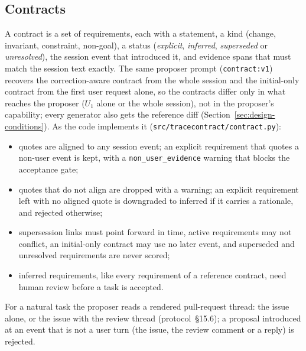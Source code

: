 \subsection{Contracts}
\label{sec:contracts}
A contract is a set of requirements, each with a statement, a kind (change, invariant, constraint, non-goal), a status
(\emph{explicit}, \emph{inferred}, \emph{superseded} or \emph{unresolved}), the session event that introduced it, and
evidence spans that must match the session text exactly. The same proposer prompt (\texttt{contract:v1}) recovers the
correction-aware contract from the whole session and the initial-only contract from the first user request alone, so
the contracts differ only in what reaches the proposer ($U_1$ alone or the whole session), not in the proposer's
capability; every generator also gets the reference diff (Section~\ref{sec:design-conditions}). As the code implements it (\texttt{src/tracecontract/contract.py}):
\begin{itemize}
\item quotes are aligned to any session event; an explicit requirement that quotes a non-user event is kept, with a
  \texttt{non\_user\_evidence} warning that blocks the acceptance gate;
\item quotes that do not align are dropped with a warning; an explicit requirement left with no aligned quote is
  downgraded to inferred if it carries a rationale, and rejected otherwise;
\item supersession links must point forward in time, active requirements may not conflict, an initial-only contract may
  use no later event, and superseded and unresolved requirements are never scored;
\item inferred requirements, like every requirement of a reference contract, need human review before a task is
  accepted.
\end{itemize}
For a natural task the proposer reads a rendered pull-request thread: the issue alone, or the issue with the review
thread (protocol~\S15.6); a proposal introduced at an event that is not a user turn (the issue, the review comment or a
reply) is rejected.

